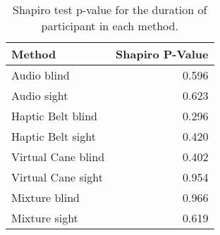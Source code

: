 
\begin{table}[!htb]
\centering
\caption{Shapiro test p-value for the duration of participant in each method.}
\label{tab:shapiro_duration}
\begin{tabular}{lr}
\toprule
            Method &  Shapiro P-Value \\
\midrule
       Audio blind &            0.596 \\
       Audio sight &            0.623 \\
 Haptic Belt blind &            0.296 \\
 Haptic Belt sight &            0.420 \\
Virtual Cane blind &            0.402 \\
Virtual Cane sight &            0.954 \\
     Mixture blind &            0.966 \\
     Mixture sight &            0.619 \\
\bottomrule
\end{tabular}
\end{table}


